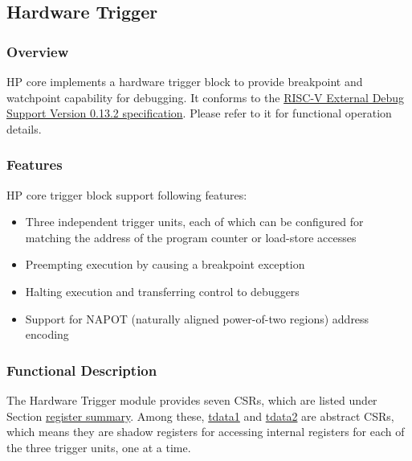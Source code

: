 \documentclass[main\_\_EN.tex]{subfiles}
\begin{document}



\newpage
\subsection{Hardware Trigger}
\label{sec:riscvcpu-hwt}

\subsubsection{Overview}
\label{sec:riscvcpu-hwt-overview}
HP core implements a hardware trigger block to provide breakpoint and watchpoint capability for debugging. It conforms to the \href{https://riscv.org/wp-content/uploads/2019/03/riscv-debug-release.pdf} {RISC-V External Debug Support Version 0.13.2 specification}. Please refer to it for functional operation details.
\subsubsection{Features}
\label{sec:riscvcpu-hwt-features}

HP core trigger block support following features:

\begin{itemize}
    \item Three independent trigger units, each of which can be configured for matching the address of the program counter or load-store accesses
    \item Preempting execution by causing a breakpoint exception
    \item Halting execution and transferring control to debuggers
    \item Support for NAPOT (naturally aligned power-of-two regions) address encoding
\end{itemize}

\subsubsection{Functional Description}
\label{sec:riscvcpu-hwt-func-descr}

The Hardware Trigger module provides seven CSRs, which are listed under Section \hyperref[sec:riscvcpu-hwt-reg-summ]{register summary}. Among these, \hyperref[regdesc:TDATA1]{tdata1} and \hyperref[regdesc:TDATA2]{tdata2} are abstract CSRs, which means they are shadow registers for accessing internal registers for each of the three trigger units, one at a time.
\end{document}
